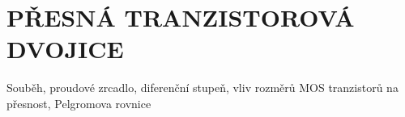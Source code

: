 \section{PŘESNÁ TRANZISTOROVÁ DVOJICE}
Souběh, proudové zrcadlo, diferenční stupeň, vliv rozměrů MOS tranzistorů na přesnost, Pelgromova rovnice